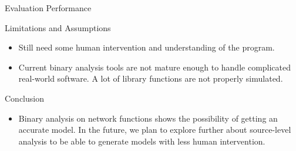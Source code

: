 \documentclass[final,hyperref={pdfpagelabels=false}]{beamer}
\begin{document}
\begin{frame}[t,fragile]
\begin{columns}[t]
\begin{column}{.47\textwidth}
\begin{block}{Evaluation Performance}

\end{block}


\begin{block}{Limitations and Assumptions}

\begin{itemize}
\item Still need some human intervention and understanding of the program.
\item Current binary analysis tools are not mature enough to handle complicated
    real-world software. A lot of library functions are not properly simulated.
\end{itemize}

\end{block}


\begin{block}{Conclusion}

\begin{itemize}
    \item Binary analysis on network functions shows the possibility of getting
        an accurate model. In the future, we plan to explore further about
        source-level analysis to be able to generate models with less human
        intervention.
\end{itemize}

\end{block}


%
%


\end{column}
\end{columns}
\end{frame}
\end{document}
